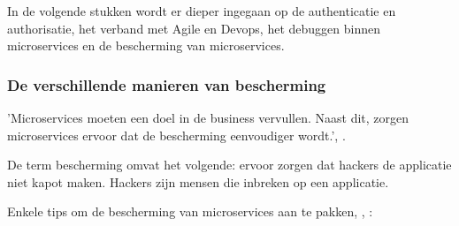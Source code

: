 In de volgende stukken wordt er dieper ingegaan op de authenticatie en authorisatie, het verband met Agile en Devops, het debuggen binnen microservices en de bescherming van microservices.

\subsubsection{De verschillende manieren van bescherming}
'Microservices moeten een doel in de business vervullen. Naast dit, zorgen microservices ervoor dat de bescherming eenvoudiger wordt.', \textcite{RDX2016}.

De term bescherming omvat het volgende: ervoor zorgen dat hackers de applicatie niet kapot maken.
Hackers zijn mensen die inbreken op een applicatie.

Enkele tips om de bescherming van microservices aan te pakken, \textcite{Matteson2017}, \textcite{Silva2017}:
